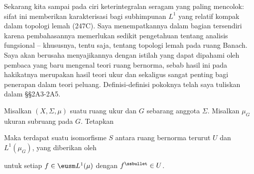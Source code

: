       
\def\chaptername{Ruang fungsi} 
\def\sectionname{Kekompakan lemah dalam $L^1$} 
      
      
Sekarang kita sampai pada ciri keterintegralan seragam yang paling mencolok:
sifat ini memberikan karakterisasi bagi subhimpunan $L^1$ yang relatif kompak
dalam topologi lemah (247C). Saya menempatkannya dalam bagian tersendiri karena
pembahasannya memerlukan sedikit pengetahuan tentang analisis fungsional --
khususnya, tentu saja, tentang topologi lemah pada ruang Banach. Saya akan
berusaha menyajikannya dengan istilah yang dapat dipahami oleh pembaca yang
baru mengenal teori ruang bernorma, sebab hasil ini pada hakikatnya merupakan
hasil teori ukur dan sekaligus sangat penting bagi penerapan dalam teori
peluang. Definisi-definisi pokoknya telah saya tuliskan dalam
\S\S2A3-2A5.  %
      
 Misalkan $(X,\Sigma,\mu)$ suatu ruang ukur dan $G$
sebarang anggota $\Sigma$. Misalkan $\mu_G$ ukuran subruang pada
$G$. Tetapkan
      
      
\noindent Maka terdapat suatu isomorfisme $S$ antara ruang bernorma terurut
$U$ dan $L^1(\mu_G)$, yang diberikan oleh
      
      
\noindent untuk setiap $f\in\eusm L^1(\mu)$ dengan
$f^{\ssbullet}\in U$.
      
